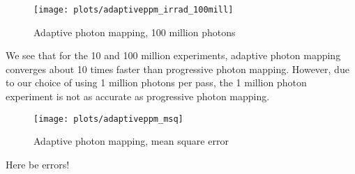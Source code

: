 \begin{figure}
    \centering
    \texttt{[image: plots/adaptiveppm\_irrad\_100mill]}\\
    \caption{Adaptive photon mapping, 100 million photons}
    \label{fig:adaptive_irrad100}
\end{figure}

We see that for the 10 and 100 million experiments, adaptive photon mapping converges about 10 times faster than progressive photon mapping. However, due to our choice of using 1 million photons per pass, the 1 million photon experiment is not as accurate as progressive photon mapping.

\begin{figure}
    \centering
    \texttt{[image: plots/adaptiveppm\_msq]}\\
    \caption{Adaptive photon mapping, mean square error}
    \label{fig:adaptive_msq}
\end{figure}

Here be errors!
